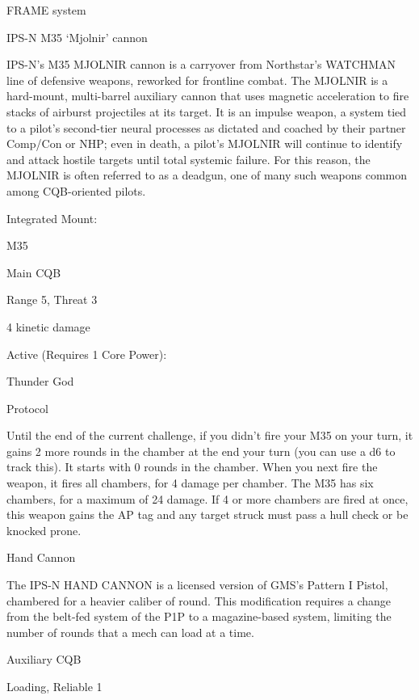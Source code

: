                                                   FRAME system 

                                           IPS-N M35 ‘Mjolnir’ cannon  

  IPS-N’s M35 MJOLNIR cannon is a carryover from Northstar’s WATCHMAN line of defensive weapons,  
  reworked for frontline combat. The MJOLNIR is a hard-mount, multi-barrel auxiliary cannon that uses  
  magnetic acceleration to fire stacks of airburst projectiles at its target. It is an impulse weapon, a system  
  tied to a pilot’s second-tier neural processes as dictated and coached by their partner Comp/Con or  
  NHP; even in death, a pilot’s MJOLNIR will continue to identify and attack hostile targets until total  
  systemic failure. For this reason, the MJOLNIR is often referred to as a deadgun, one of many such  
  weapons common among CQB-oriented pilots.        

  Integrated Mount:
 
  M35
 
  Main CQB
 
  Range 5, Threat 3
 
  4 kinetic damage
 

  Active (Requires 1 Core Power):
 
  Thunder God
 
  Protocol
 
  Until the end of the current challenge, if you didn’t fire your M35 on your turn, it gains 2 more rounds in  
  the chamber at the end your turn (you can use a d6 to track this). It starts with 0 rounds in the chamber.  
  When you next fire the weapon, it fires all chambers, for 4 damage per chamber. The M35 has six  
  chambers, for a maximum of 24 damage. If 4 or more chambers are fired at once, this weapon gains  
  the AP tag and any target struck must pass a hull check or be knocked prone. 

Hand Cannon  

                                                                                                                 


The IPS-N HAND CANNON is a licensed version of GMS’s Pattern I Pistol, chambered for a heavier caliber  
of round. This modification requires a change from the belt-fed system of the P1P to a magazine-based  
system, limiting the number of rounds that a mech can load at a time.   

Auxiliary CQB
 
Loading, Reliable 1
 
